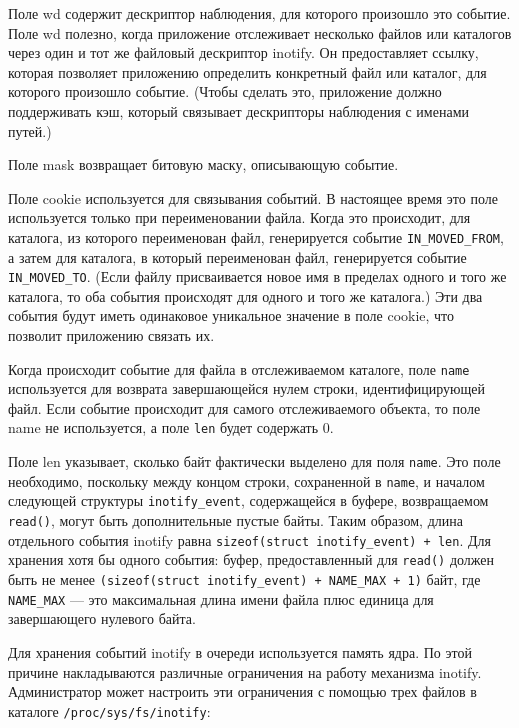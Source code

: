 \documentclass[14pt, russian]{scrartcl}
\newcommand{\code}[1]{\texttt{#1}}
\begin{document}
Поле wd содержит дескриптор наблюдения, для которого произошло это событие. Поле
wd полезно, когда приложение отслеживает несколько файлов или каталогов через
один и тот же файловый дескриптор inotify. Он предоставляет ссылку, которая
позволяет приложению определить конкретный файл или каталог, для которого
произошло событие. (Чтобы сделать это, приложение должно поддерживать кэш,
который связывает дескрипторы наблюдения с именами путей.)

Поле mask возвращает битовую маску, описывающую событие.

Поле cookie используется для связывания событий. В настоящее время это поле
используется только при переименовании файла. Когда это происходит, для
каталога, из которого переименован файл, генерируется событие
\code{IN\_MOVED\_FROM}, а затем для каталога, в который переименован файл,
генерируется событие \code{IN\_MOVED\_TO}. (Если файлу присваивается новое имя в
пределах одного и того же каталога, то оба события происходят для одного и того
же каталога.) Эти два события будут иметь одинаковое уникальное значение в поле
cookie, что позволит приложению связать их.

Когда происходит событие для файла в отслеживаемом каталоге, поле \code{name}
используется для возврата завершающейся нулем строки, идентифицирующей файл.
Если событие происходит для самого отслеживаемого объекта, то поле name не
используется, а поле \code{len} будет содержать 0.

Поле len указывает, сколько байт фактически выделено для поля \code{name}. Это
поле необходимо, поскольку между концом строки, сохраненной в \code{name}, и
началом следующей структуры \code{inotify\_event}, содержащейся в буфере,
возвращаемом \code{read()}, могут быть дополнительные пустые байты. Таким
образом, длина отдельного события inotify равна \code{sizeof(struct
  inotify\_event) + len}. Для хранения хотя бы одного события: буфер,
предоставленный для \code{read()} должен быть не менее \code{(sizeof(struct
  inotify\_event) + NAME\_MAX + 1)} байт, где \code{NAME\_MAX} --- это максимальная
длина имени файла плюс единица для завершающего нулевого байта.

Для хранения событий inotify в очереди используется память ядра. По этой причине
накладываются различные ограничения на работу механизма inotify. Администратор
может настроить эти ограничения с помощью трех файлов в каталоге
\code{/proc/sys/fs/inotify}:
\end{document}
